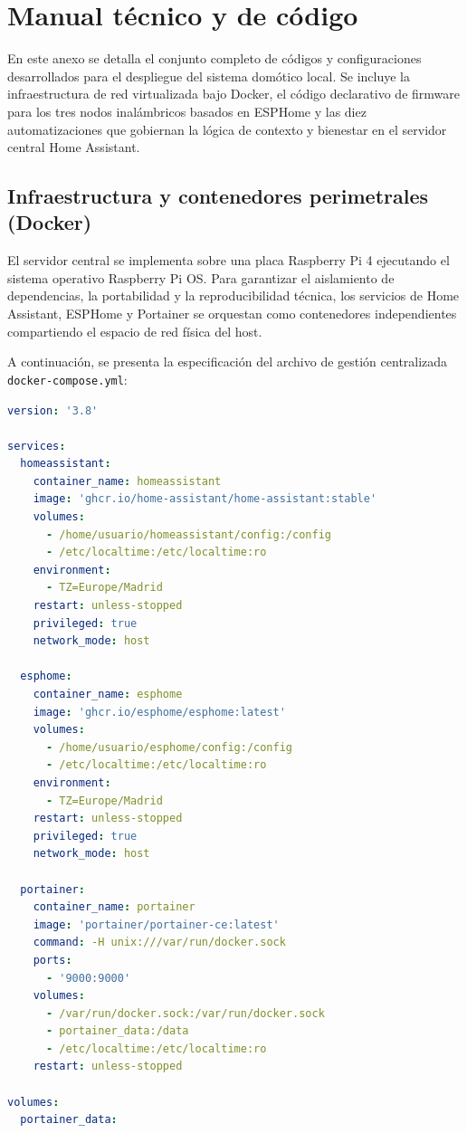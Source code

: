 \newpage
\section{Manual técnico y de código}
\label{anexo:manual_tecnico_codigo}

En este anexo se detalla el conjunto completo de códigos y configuraciones desarrollados para el despliegue del sistema domótico local. Se incluye la infraestructura de red virtualizada bajo Docker, el código declarativo de firmware para los tres nodos inalámbricos basados en ESPHome y las diez automatizaciones que gobiernan la lógica de contexto y bienestar en el servidor central Home Assistant.

\subsection{Infraestructura y contenedores perimetrales (Docker)}
El servidor central se implementa sobre una placa Raspberry Pi 4 ejecutando el sistema operativo Raspberry Pi OS. Para garantizar el aislamiento de dependencias, la portabilidad y la reproducibilidad técnica, los servicios de Home Assistant, ESPHome y Portainer se orquestan como contenedores independientes compartiendo el espacio de red física del host.

A continuación, se presenta la especificación del archivo de gestión centralizada \texttt{docker-compose.yml}:

\begin{lstlisting}[language=YAML, caption={Archivo de gestión centralizada de contenedores en la Raspberry Pi 4 (docker-compose.yml).}, label={lst:docker_compose}]
version: '3.8'

services:
  homeassistant:
    container_name: homeassistant
    image: 'ghcr.io/home-assistant/home-assistant:stable'
    volumes:
      - /home/usuario/homeassistant/config:/config
      - /etc/localtime:/etc/localtime:ro
    environment:
      - TZ=Europe/Madrid
    restart: unless-stopped
    privileged: true
    network_mode: host

  esphome:
    container_name: esphome
    image: 'ghcr.io/esphome/esphome:latest'
    volumes:
      - /home/usuario/esphome/config:/config
      - /etc/localtime:/etc/localtime:ro
    environment:
      - TZ=Europe/Madrid
    restart: unless-stopped
    privileged: true
    network_mode: host

  portainer:
    container_name: portainer
    image: 'portainer/portainer-ce:latest'
    command: -H unix:///var/run/docker.sock
    ports:
      - '9000:9000'
    volumes:
      - /var/run/docker.sock:/var/run/docker.sock
      - portainer_data:/data
      - /etc/localtime:/etc/localtime:ro
    restart: unless-stopped

volumes:
  portainer_data:
\end{lstlisting}

